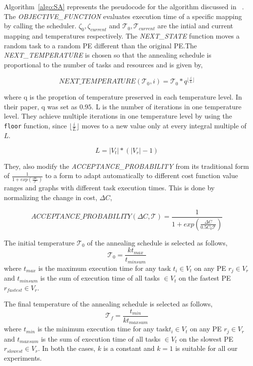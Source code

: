 Algorithm~\ref{algo:SA} represents the pseudocode for the algorithm discussed in
~\cite{hors06}. The \textit{OBJECTIVE\_FUNCTION} evaluates execution time of a
specific mapping by calling the scheduler. $\zeta_0, \zeta_{current}$ and
$\mathcal{T}_0, \mathcal{T}_{current}$ are the intial and current mapping and
temperatures respectively. The \textit{NEXT\_STATE} function moves a random task
to a random PE different than the original PE.The \textit{NEXT\_TEMPERATURE} is
chosen so that the annealing schedule is proportional to the number of tasks and
resources and is given by,

\begin{equation}
\textit{NEXT\_TEMPERATURE}(\mathcal{T}_0, i) = \mathcal{T}_0*q^{\lfloor
\frac{i}{L} \rfloor}
\end{equation}

where q is the proprtion of temperature preserved in each temperature level. In
their paper, q was set as $0.95$. L is the number of iterations in one
temperature level. They achieve multiple iterations in one temperature level by
using the \texttt{floor} function, since $\lfloor \frac{i}{L} \rfloor$ moves to
a new value only at every integral multiple of $L$.

\begin{equation}
L = |V_t|*(|V_r| - 1)
\end{equation}

They, also modify the \textit{ACCEPTANCE\_PROBABILITY} from its traditional form
of $\frac{1}{1+exp(\frac{\Delta C}{\mathcal{T}})}$ to a form to adapt
automatically to different cost function value ranges and graphs with different
task execution times. This is done by normalizing the change in cost, $\Delta
C$,

\begin{equation}
ACCEPTANCE\_PROBABILITY(\Delta C, \mathcal{T}) = \frac{1}{1+exp(\frac{\Delta
C}{0.5C_0\mathcal{T}})}
\end{equation}

The initial temperature $\mathcal{T}_0$ of the annealing schedule is selected as
follows,
\begin{equation}
\mathcal{T}_0 = \frac{kt_{max}}{t_{minsum}}
\end{equation}
where $t_{max}$ is the maximum execution time for any task $t_i \in V_t$ on any
PE $r_j \in V_r$ and $t_{minsum}$ is the sum of execution time of all tasks $\in
V_t$ on the fastest PE $r_{fastest} \in V_r$.

The final temperature of the annealing schedule is selected as follows,
\begin{equation}
\mathcal{T}_f = \frac{t_{min}}{kt_{maxsum}}
\end{equation}
where $t_{min}$ is the minimum execution time for any task$t_i \in V_t$ on any
PE $r_j \in V_r$ and $t_{maxsum}$ is the sum of execution time of all tasks $\in
V_t$ on the slowest PE $r_{slowest} \in V_r$. In both the cases, $k$ is a
constant and $k=1$ is suitable for all our experiments.


